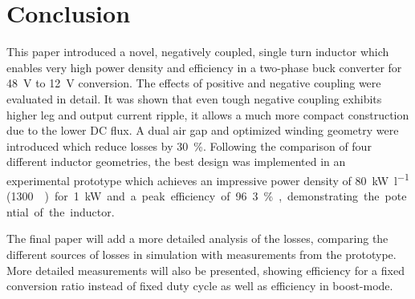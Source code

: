 \documentclass{IPEC2026}
\begin{document}
\section{Conclusion}
This paper introduced a novel, negatively coupled, single turn inductor which enables very high power density and efficiency in a two-phase buck converter for \qty{48}{\V} to \qty{12}{\V} conversion. The effects of positive and negative coupling were evaluated in detail. It was shown that even tough negative coupling exhibits higher leg and output current ripple, it allows a much more compact construction due to the lower DC flux. A dual air gap and optimized winding geometry were introduced which reduce losses by \qty{30}{\percent}. Following the comparison of four different inductor geometries, the best design was implemented in an experimental prototype which achieves an impressive power density of \qty{80}{\kW\per\l} (\qty{1300}{\W\per\cubic\inch}) for \qty{1}{\kW} and a peak efficiency of 96.3\%, demonstrating the potential of the inductor. \par
The final paper will add a more detailed analysis of the losses, comparing the different sources of losses in simulation with measurements from the prototype. More detailed measurements will also be presented, showing efficiency for a fixed conversion ratio instead of fixed duty cycle as well as efficiency in boost-mode. %



\end{document}
